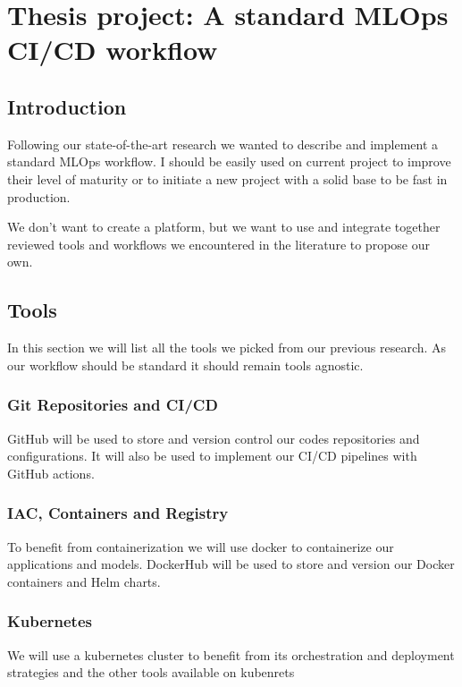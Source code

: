 \chapter{Thesis project: A standard MLOps CI/CD workflow}\label{ch:thesis-project:-a-standard-mlops-ci/cd-workflow}
\section{Introduction}\label{sec:introduction}
Following our state-of-the-art research we wanted to describe and implement a standard MLOps workflow.
I should be easily used on current project to improve their level of maturity or to initiate a new project with a solid
base to be fast in production.

We don't want to create a platform, but we want to use and integrate together reviewed
tools and workflows we encountered in the literature to propose our own.

\section{Tools}\label{sec:tools2}
In this section we will list all the tools we picked from our previous research.
As our workflow should be standard it should remain tools agnostic.

\subsection{Git Repositories and CI/CD}\label{subsec:github}
GitHub will be used to store and version control our codes repositories and configurations.
It will also be used to implement our CI/CD pipelines with GitHub actions.

\subsection{IAC, Containers and Registry}\label{subsec:dockerhub}
To benefit from containerization we will use docker to containerize our applications and models.
DockerHub will be used to store and version our Docker containers and Helm charts.

\subsection{Kubernetes}\label{subsec:kubernetes}
We will use a kubernetes cluster to benefit from its orchestration and deployment strategies and the other tools available
on kubenrets

